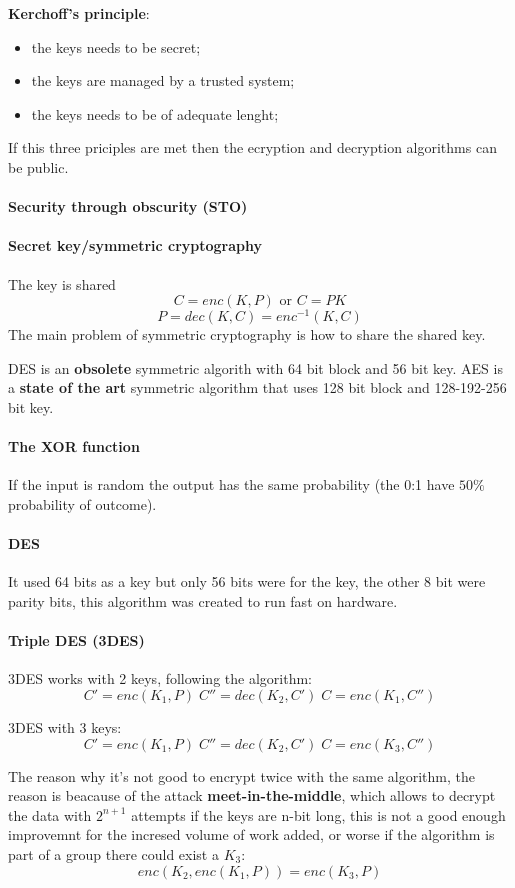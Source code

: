 \documentclass[12pt]{article}
\begin{document}
\textbf{Kerchoff's principle}:
\begin{itemize}
    \item the keys needs to be secret;
    \item the keys are managed by a trusted system;
    \item the keys needs to be of adequate lenght;
\end{itemize}
If this three priciples are met then the ecryption and decryption algorithms can be public.

\paragraph{Security through obscurity (STO)}

\paragraph{Secret key/symmetric cryptography}
The key is shared
\[ C = enc (K, P) \text{ or } C = {P} K \]
\[ P = dec (K, C) = enc^{-1}(K, C) \]
The main problem of symmetric cryptography is how to share the shared key.

DES is an \textbf{obsolete} symmetric algorith with 64 bit block and 56 bit key. AES is a \textbf{state of the art} symmetric algorithm that uses 128 bit block and 128-192-256 bit key.

\paragraph{The XOR function}
If the input is random the output has the same probability (the 0:1 have $50\%$ probability of outcome).

\paragraph{DES}
It used 64 bits as a key but only 56 bits were for the key, the other 8 bit were parity bits, this algorithm was created to run fast on hardware.

\paragraph{Triple DES (3DES)}
3DES works with 2 keys, following the algorithm:
\[ C' = enc(K_1,P) \; C'' = dec(K_2,C') \; C = enc(K_1,C'') \]

3DES with 3 keys:
\[ C' = enc(K_1,P) \; C'' = dec(K_2,C') \; C = enc(K_3,C'') \]

The reason why it's not good to encrypt twice with the same algorithm, the reason is beacause of the attack \textbf{meet-in-the-middle}, which allows to decrypt the data with $2^{n+1}$ attempts if the keys are n-bit long, this is not a good enough improvemnt for the incresed volume of work added, or worse if the algorithm is part of a group there could exist a $K_3$:
\[ enc( K_2, enc(K_1, P)) = enc(K_3,P) \]
\end{document}
